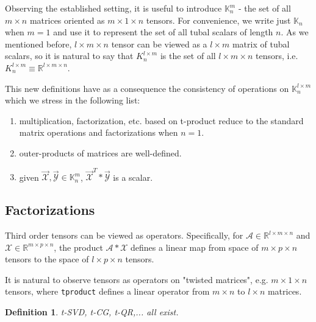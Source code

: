 \documentclass[twoside]{article}
\newtheorem{defn}{Definition}
\newcommand{\code}[1]{\texttt{#1}}
\begin{document}
\begin{multicols}{2}
\noindent Observing the established setting, it is useful to introduce $\mathbb{K}^m_n$ - the set of all $m \times n$ matrices oriented as $m \times 1 \times n$ tensors. For convenience, we write just $\mathbb{K}_n$ when $m=1$ and use it to represent the set of all tubal scalars of length $n$. As we mentioned before, $l \times m \times n$ tensor can be viewed as a $l \times m$ matrix of tubal scalars, so it is natural to say that $K^{l \times m}_n$ is the set of all $l \times m \times n$ tensors, i.e. $K^{l \times m}_n \equiv \mathbb{R}^{l \times m \times n}$.

This new definitions have as a consequence the consistency of operations on $\mathbb{K}^{l \times m}_n$ which we stress in the following list:
\begin{enumerate}
	\item multiplication, factorization, etc. based on t-product reduce to the standard matrix operations and factorizations when $n=1$.
	\item outer-products of matrices are well-defined.
	\item given $\overrightarrow{\mathcal{X}}, \overrightarrow{\mathcal{Y}} \in \mathbb{K}^m_n$, $\overrightarrow{\mathcal{X}}^T \ast \overrightarrow{\mathcal{Y}}$ is a scalar.
\end{enumerate}

\subsection{Factorizations}
Third order tensors can be viewed as operators. Specifically, for $\mathcal{A} \in \mathbb{R}^{l \times m \times n}$ and $\mathcal{X} \in \mathbb{R}^{m \times p \times n}$, the product $\mathcal{A} \ast \mathcal{X}$ defines a linear map from space of $m \times p \times n$ tensors to the space of $l \times p \times n$ tensors.

It is natural to observe tensors as operators on "twisted matrices", e.g. $m \times 1 \times n$ tensors, where \code{tproduct} defines a linear operator from $m \times n$ to $l \times n$ matrices.

\begin{defn} t-SVD, t-CG, t-QR,... all exist.
\end{defn}



\end{multicols}
\end{document}
